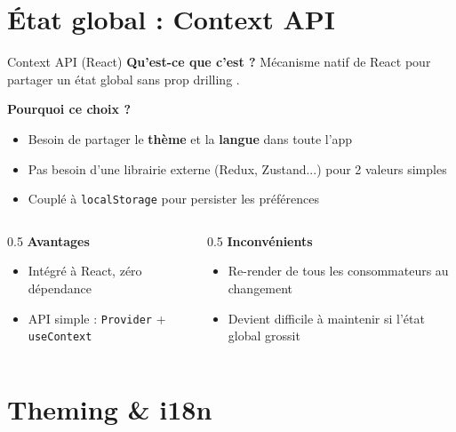 \documentclass[aspectratio=169]{beamer}
\begin{document}
\section{État global : Context API}

\begin{frame}{Context API (React)}
  \textbf{Qu'est-ce que c'est ?} Mécanisme natif de React pour partager un état global sans \og prop drilling \fg{}.

  \vspace{0.3cm}
  \textbf{Pourquoi ce choix ?}
  \begin{itemize}
    \item Besoin de partager le \textbf{thème} et la \textbf{langue} dans toute l'app
    \item Pas besoin d'une librairie externe (Redux, Zustand...) pour 2 valeurs simples
    \item Couplé à \texttt{localStorage} pour persister les préférences
  \end{itemize}

  \vspace{0.3cm}
  \begin{columns}
    \begin{column}{0.5\textwidth}
      \textbf{Avantages}
      \begin{itemize}
        \item Intégré à React, zéro dépendance
        \item API simple : \texttt{Provider} + \texttt{useContext}
      \end{itemize}
    \end{column}
    \begin{column}{0.5\textwidth}
      \textbf{Inconvénients}
      \begin{itemize}
        \item Re-render de tous les consommateurs au changement
        \item Devient difficile à maintenir si l'état global grossit
      \end{itemize}
    \end{column}
  \end{columns}
\end{frame}

\section{Theming \& i18n}
\end{document}
